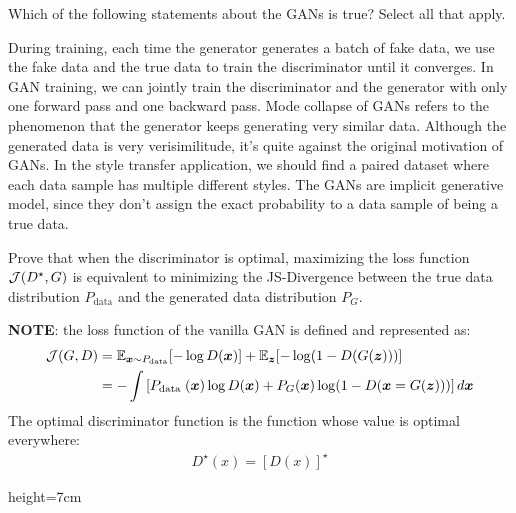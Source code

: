 \begin{questions}
    \question[6] Which of the following statements about the GANs is true? Select all that apply.
    
    \begin{checkboxes}
        \choice During training, each time the generator generates a batch of fake data, we use the fake data and the true data to train the discriminator until it converges.
        \choice In GAN training, we can jointly train the discriminator and the generator with only one forward pass and one backward pass.
        \choice Mode collapse of GANs refers to the phenomenon that the generator keeps generating very similar data. Although the generated data is very verisimilitude, it's quite against the original motivation of GANs.
        \choice In the style transfer application, we should find a paired dataset where each data sample has multiple different styles.
        \choice The GANs are implicit generative model, since they don't assign the exact probability to a data sample of being a true data. 
    \end{checkboxes}

    \question[6] Prove that when the discriminator is optimal, maximizing the loss function ${\mathcal{J}}(D^\star, G)$ is equivalent to minimizing the JS-Divergence between the true data distribution $P_\text{data}$ and the generated data distribution $P_G$.
    
    \textbf{NOTE}: the loss function of the vanilla GAN is defined and represented as:
    \begin{align*}
        {\mathcal{J}}(G,D) 
        &= \mathbb{E}_{{\bm{x}} \sim P_{\text{data}}}[-\log D({\bm{x}})]+\mathbb{E}_{{\bm{z}}}[-\log (1-D(G({\bm{z}})))]\\
        &= -\int\left[P_{\text {data }}({\bm{x}}) \log D({\bm{x}})+P_{G}({\bm{x}}) \log (1-D({\bm{x}}=G({\bm{z}})))\right] d {\bm{x}}
    \end{align*}
    The optimal discriminator function is the function whose value is optimal everywhere: 
    \begin{align*}
        D^\star(x) = [D(x)]^\star
    \end{align*}
    
    \begin{soln}{height=7cm}
    \end{soln}
    
\end{questions}
